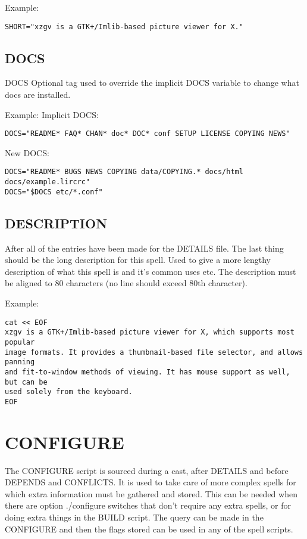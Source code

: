 \documentclass[a4paper,10pt]{book}
\begin{document}
Example:
\begin{verbatim}
SHORT="xzgv is a GTK+/Imlib-based picture viewer for X."
\end{verbatim}

\subsection{DOCS}
DOCS Optional tag used to override the implicit DOCS variable to change what
docs are installed.

Example:
Implicit DOCS:
\begin{verbatim}
DOCS="README* FAQ* CHAN* doc* DOC* conf SETUP LICENSE COPYING NEWS"
\end{verbatim}

New DOCS:
\begin{verbatim}
DOCS="README* BUGS NEWS COPYING data/COPYING.* docs/html docs/example.lircrc"
DOCS="$DOCS etc/*.conf"
\end{verbatim}

\subsection{DESCRIPTION}
	After all of the entries have been made for the DETAILS file. The
	last thing should be the long description for this spell. Used to
	give a more lengthy description of what this spell is and it's common
	uses etc. The description must be aligned to 80 characters (no line
	should exceed 80th character).

Example:
\begin{verbatim}
cat << EOF
xzgv is a GTK+/Imlib-based picture viewer for X, which supports most popular
image formats. It provides a thumbnail-based file selector, and allows panning
and fit-to-window methods of viewing. It has mouse support as well, but can be
used solely from the keyboard.
EOF
\end{verbatim}

\section{CONFIGURE}
The CONFIGURE script is sourced during a cast, after DETAILS and before DEPENDS
and CONFLICTS. It is used to take care of more complex spells for which extra
information must be gathered and stored. This can be needed when there are
option ./configure switches that don't require any extra spells, or for doing
extra things in the BUILD script. The query can be made in the CONFIGURE and
then the flags stored can be used in any of the spell scripts.
\end{document}
